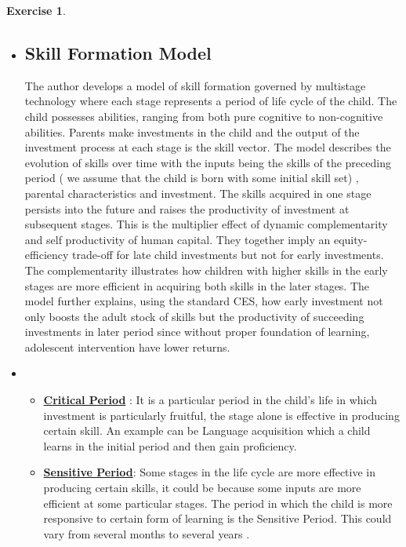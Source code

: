 \documentclass[11pt,a4paper,leqno]{article}
\theoremstyle{definition}
\newtheorem{exercise}{Exercise}
\begin{document}
\begin{exercise}
\begin{enumerate}
\begin{itemize}
        \item  \subsection*{Skill Formation Model}
        The author develops a model of skill formation governed by multistage technology where each stage represents a period of life cycle of the child. The child possesses abilities, ranging from both pure cognitive to non-cognitive abilities. Parents make investments in the child and the output of the investment process at each stage is the skill vector. The model describes the evolution of skills over time with the inputs being the skills of the preceding period ( we assume that the child is born with some initial skill set) , parental characteristics and investment. The skills acquired in one stage persists into the future and raises the productivity of investment at subsequent stages. This is the multiplier effect of dynamic complementarity and self productivity of human capital. They together imply an equity-efficiency trade-off for late child investments but not for early investments. The complementarity illustrates how children with higher skills in the early stages are more efficient in acquiring both skills in the later stages. The model further explains, using the standard CES, how early investment not only boosts the adult stock of skills but the productivity of succeeding investments in later period since without proper foundation of learning, adolescent intervention have lower returns. 
        \newline
        
        \item 
        \begin{itemize}
        \item \textbf{\underline{Critical Period}} : It is a particular period in the child's life in which investment is particularly fruitful, the stage alone is effective in producing  certain skill. An example can be Language acquisition which a child learns in the initial period and then gain proficiency. 
        
        
       \item \textbf{\underline{Sensitive Period}}: Some stages in the life cycle are  more effective in producing certain skills, it could be because some inputs are more efficient at some particular stages. The period in which the child is more responsive to certain form of learning is the Sensitive Period. This could vary from several months to several years .
        

\end{itemize}
\end{itemize}
\end{enumerate}
\end{exercise}
\end{document}
